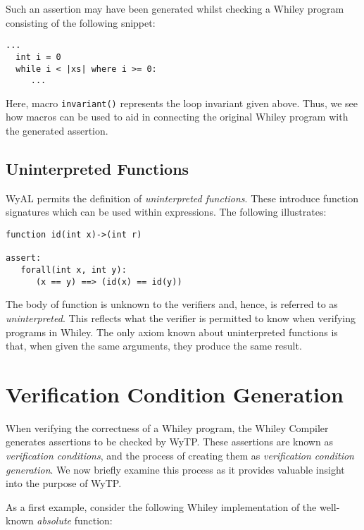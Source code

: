 Such an assertion may have been generated whilst checking a Whiley
program consisting of the following snippet:
\begin{tcolorbox}\begin{lstlisting}[language=Whiley]
  ...
  int i = 0
  while i < |xs| where i >= 0:
     ...
\end{lstlisting}\end{tcolorbox}

Here, macro \lstinline{invariant()} represents the loop invariant
given above.  Thus, we see how macros can be used to aid in connecting
the original Whiley program with the generated assertion.

\subsection{Uninterpreted Functions}

WyAL permits the definition of {\em uninterpreted functions}.  These
introduce function signatures which can be used within expressions.
The following illustrates:
\begin{tcolorbox}\begin{lstlisting}[language=WyAL]
function id(int x)->(int r)

assert:
   forall(int x, int y):
      (x == y) ==> (id(x) == id(y))
\end{lstlisting}\end{tcolorbox}

The body of function  is unknown to the verifiers and,
hence, is referred to as {\em uninterpreted}.  This reflects what the
verifier is permitted to know when verifying programs in Whiley.  The
only axiom known about uninterpreted functions is that, when given the
same arguments, they produce the same result.

\section{Verification Condition Generation}

When verifying the correctness of a Whiley program, the Whiley
Compiler generates assertions to be checked by WyTP.  These assertions
are known as {\em verification conditions}, and the process of
creating them as {\em verification condition generation}.  We now
briefly examine this process as it provides valuable insight into the
purpose of WyTP.

As a first example, consider the following Whiley implementation of
the well-known {\em absolute} function:

